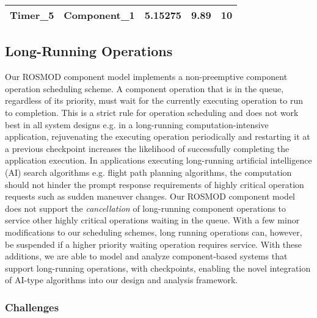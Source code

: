 \begin{table}[]
\begin{tabular}{|c|c|c|c|c|}
		Timer\_5                                                          & Component\_1                                                      & 5.15275                                                                   & 9.89                                                                         & 10                                                               \\ \hline
	\end{tabular}
\end{table}

\subsection{Long-Running Operations}
\label{sec:long_running_operations}

Our ROSMOD component model implements a non-preemptive component operation scheduling scheme. A component operation that is in the queue, regardless of its priority, must wait for the currently executing operation to run to completion. This is a strict rule for operation scheduling and does not work best in all system designs e.g. in a long-running computation-intensive application, rejuvenating the executing operation periodically and restarting it at a previous checkpoint increases the likelihood of successfully completing the application execution. In applications executing long-running artificial intelligence (AI) search algorithms e.g. flight path planning algorithms, the computation should not hinder the prompt response requirements of highly critical operation requests such as sudden maneuver changes. Our ROSMOD component model does not support the \emph{cancellation} of long-running component operations to service other highly critical operations waiting in the queue. With a few minor modifications to our scheduling schemes, long running operations can, however, be suspended if a higher priority waiting operation requires service. With these additions, we are able to model and analyze component-based systems that support long-running operations, with checkpoints, enabling the novel integration of AI-type algorithms into our design and analysis framework. 

\subsubsection{Challenges}

